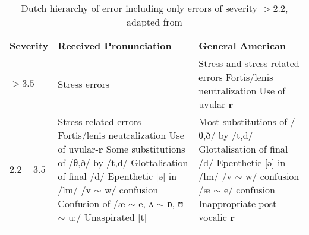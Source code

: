 \documentclass[output=paper]{LSP/langsci}
\begin{document}
\begin{table}[h]
\begin{tabular}{l  p{4.4cm} @{\hskip 1cm} p{4.4cm}}
\lsptoprule %
{Severity} & {Received Pronunciation} & {General American} \\ \midrule \midrule
{$> 3.5$} & Stress errors & Stress and stress-related \newline errors \vspace{0.2cm} \newline  Fortis/lenis neutralization \vspace{0.2cm} \newline Use of uvular-\textbf{r} \\ \midrule
{$2.2-3.5$} & Stress-related errors \vspace{0.2cm} \newline Fortis/lenis neutralization \vspace{0.2cm} \newline Use of uvular-\textbf{r} \vspace{0.2cm} \newline Some substitutions of /θ,ð/ by /t,d/ \vspace{0.2cm} \newline Glottalisation of final /d/ \vspace{0.2cm} \newline Epenthetic [ə] in /lm/ \vspace{0.2cm} \newline /v $\sim$ w/ confusion \vspace{0.2cm} \newline Confusion of /æ $\sim$ e, ʌ $\sim$ ɒ, ʊ $\sim$ u:/ \vspace{0.2cm} \newline Unaspirated [t] & Most substitutions of /θ,ð/ by /t,d/ \vspace{0.2cm} \newline Glottalisation of final /d/ \vspace{0.2cm} \newline Epenthetic [ə] in /lm/ \vspace{0.2cm} \newline /v $\sim$ w/ confusion \vspace{0.2cm} \newline /æ $\sim$ e/ confusion \vspace{0.2cm} \newline Inappropriate post-vocalic \textbf{r}
\\ 
\lspbottomrule %
\end{tabular}
\caption{Dutch hierarchy of error including only errors of severity $> 2.2$, adapted from \citet{van_den_doel_evaluation_2006}}
\label{tb:doel}
\end{table}
\end{document}
